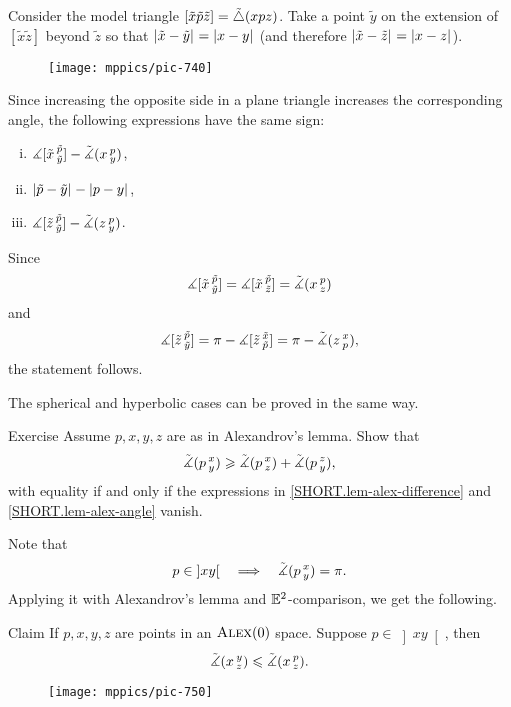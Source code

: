 Consider the model triangle $[\tilde x\tilde p\tilde z]=\tilde\triangle(x p z)$.
Take 
a point $\tilde y$ on the extension of 
$[\tilde x \tilde z]$ beyond $\tilde z$ so that $\dist{\tilde x}{\tilde y}{}=\dist{x}{y}{}$ (and therefore $\dist{\tilde x}{\tilde z}{}=\dist{x}{z}{}$). 

\begin{wrapfigure}{r}{33mm}
\vskip-0mm
\centering
\texttt{[image: mppics/pic-740]}
\end{wrapfigure}

Since increasing the opposite side in a plane triangle increases the corresponding angle, 
the following expressions have the same sign:
\begin{enumerate}[(i)]
\item $\measuredangle[\tilde x\,{}^{\tilde p}_{\tilde y}]-\tilde\measuredangle(x\,{}^{p}_{y})$,
\item $\dist{\tilde p}{\tilde y}{}-\dist{p}{y}{}$,
\item $\measuredangle[\tilde z\,{}^{\tilde p}_{\tilde y}]-\tilde\measuredangle(z\,{}^{p}_{y})$.
\end{enumerate}
Since 
\[\measuredangle[\tilde x\,{}^{\tilde p}_{\tilde y}]=\measuredangle[\tilde x\,{}^{\tilde p}_{\tilde z}]=\tilde\measuredangle(x\,{}^{p}_{z})\]
and
\[ \measuredangle[\tilde z\,{}^{\tilde p}_{\tilde y}]
=\pi-\measuredangle[\tilde z\,{}^{\tilde x}_{\tilde p}]
=\pi-\tilde\measuredangle(z\,{}^{x}_{p}),\]
the statement follows.


The spherical and hyperbolic cases can be proved in the same way.
\qeds

\begin{thm}{Exercise}\label{ex:alex-lemma-cat}
Assume $p,x,y,z$ are as in Alexandrov's lemma.
Show that
\[\tilde\measuredangle(p\,{}^{x}_{y})
\geqslant
\tilde\measuredangle(p\,{}^{x}_{z}) + \tilde\measuredangle(p\,{}^{z}_{y}),\]
with equality if and only if the expressions in \ref{SHORT.lem-alex-difference} and \ref{SHORT.lem-alex-angle} vanish.
\end{thm}

Note that 
\[p\in\left]x y\right[
\quad\Longrightarrow\quad
\tilde\measuredangle(p\,{}^{x}_{y})=\pi.
\]
Applying it with Alexandrov's lemma and $\mathbb{E}^2$-comparison, we get the following.

\begin{thm}{Claim}\label{clm:angle-mono}
If $p,x,y,z$ are points in an $\textsc{Alex}(0)$ space.
Suppose $p\in\left]x y\right[$, then 
\[\tilde\measuredangle(x\,{}^{y}_{z})\leqslant \tilde\measuredangle(x\,{}^{p}_{z}).\]
\end{thm}

\begin{wrapfigure}{r}{25mm}
\vskip-0mm
\centering
\texttt{[image: mppics/pic-750]}
\end{wrapfigure}

